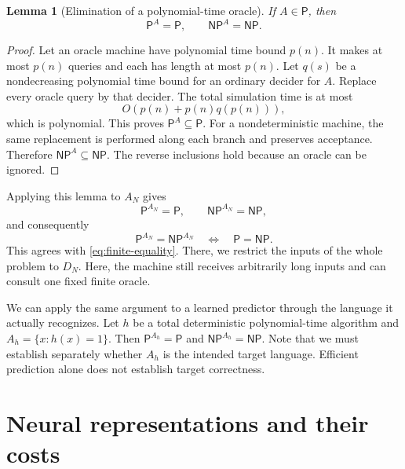 \documentclass[11pt,a4paper]{article}
\numberwithin{equation}{section}
\newcommand{\Pclass}{\mathsf{P}}
\newcommand{\NPclass}{\mathsf{NP}}
\theoremstyle{plain}
\newtheorem{lemma}{Lemma}[section]
\theoremstyle{definition}
\theoremstyle{remark}
\begin{document}
\begin{lemma}[Elimination of a polynomial-time oracle]
\label{lem:eliminate}
If $A\in\Pclass$, then
\begin{equation}
\Pclass^A=\Pclass,\qquad\NPclass^A=\NPclass.
\label{eq:oracle-eliminate}
\end{equation}
\end{lemma}

\begin{proof}
Let an oracle machine have polynomial time bound $p(n)$. It makes at most $p(n)$ queries and each has length at most $p(n)$. Let $q(s)$ be a nondecreasing polynomial time bound for an ordinary decider for $A$. Replace every oracle query by that decider. The total simulation time is at most
\begin{equation}
O\!\left(p(n)+p(n)q(p(n))\right),
\end{equation}
which is polynomial. This proves $\Pclass^A\subseteq\Pclass$. For a nondeterministic machine, the same replacement is performed along each branch and preserves acceptance. Therefore $\NPclass^A\subseteq\NPclass$. The reverse inclusions hold because an oracle can be ignored.
\end{proof}

Applying this lemma to $A_N$ gives
\begin{equation}
\Pclass^{A_N}=\Pclass,\qquad
\NPclass^{A_N}=\NPclass,
\end{equation}
and consequently
\begin{equation}
\Pclass^{A_N}=\NPclass^{A_N}
\quad\Longleftrightarrow\quad
\Pclass=\NPclass.
\end{equation}
This agrees with \eqref{eq:finite-equality}. There, we restrict the inputs of the whole problem to $D_N$. Here, the machine still receives arbitrarily long inputs and can consult one fixed finite oracle.

We can apply the same argument to a learned predictor through the language it actually recognizes. Let $h$ be a total deterministic polynomial-time algorithm and $A_h=\{x:h(x)=1\}$. Then $\Pclass^{A_h}=\Pclass$ and $\NPclass^{A_h}=\NPclass$. Note that we must establish separately whether $A_h$ is the intended target language. Efficient prediction alone does not establish target correctness.

\section{Neural representations and their costs}
\label{sec:neural}
\end{document}
